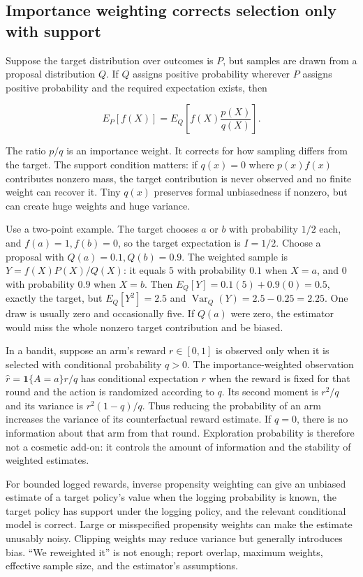 \subsection{Importance weighting corrects selection only with support}\label{02-foundations-ii-ch029-importance-weighting-corrects-selection-only-with-support}

Suppose the target distribution over outcomes is \(P\), but samples are drawn from a proposal distribution \(Q\). If \(Q\) assigns positive probability wherever \(P\) assigns positive probability and the required expectation exists, then

\[
E_P[f(X)]=E_Q\left[f(X)\frac{p(X)}{q(X)}\right].
\]

The ratio \(p/q\) is an importance weight. It corrects for how sampling differs from the target. The support condition matters: if \(q(x)=0\) where \(p(x)f(x)\) contributes nonzero mass, the target contribution is never observed and no finite weight can recover it. Tiny \(q(x)\) preserves formal unbiasedness if nonzero, but can create huge weights and huge variance.

Use a two-point example. The target chooses \(a\) or \(b\) with probability \(1/2\) each, and \(f(a)=1,f(b)=0\), so the target expectation is \(I=1/2\). Choose a proposal with \(Q(a)=0.1,Q(b)=0.9\). The weighted sample is \(Y=f(X)P(X)/Q(X)\): it equals \(5\) with probability \(0.1\) when \(X=a\), and \(0\) with probability \(0.9\) when \(X=b\). Then \(E_Q[Y]=0.1(5)+0.9(0)=0.5\), exactly the target, but \(E_Q[Y^2]=2.5\) and \(\operatorname{Var}_Q(Y)=2.5-0.25=2.25\). One draw is usually zero and occasionally five. If \(Q(a)\) were zero, the estimator would miss the whole nonzero target contribution and be biased.

In a bandit, suppose an arm's reward \(r\in[0,1]\) is observed only when it is selected with conditional probability \(q>0\). The importance-weighted observation \(\hat r=\mathbf 1\{A=a\}r/q\) has conditional expectation \(r\) when the reward is fixed for that round and the action is randomized according to \(q\). Its second moment is \(r^2/q\) and its variance is \(r^2(1-q)/q\). Thus reducing the probability of an arm increases the variance of its counterfactual reward estimate. If \(q=0\), there is no information about that arm from that round. Exploration probability is therefore not a cosmetic add-on: it controls the amount of information and the stability of weighted estimates.

For bounded logged rewards, inverse propensity weighting can give an unbiased estimate of a target policy's value when the logging probability is known, the target policy has support under the logging policy, and the relevant conditional model is correct. Large or misspecified propensity weights can make the estimate unusably noisy. Clipping weights may reduce variance but generally introduces bias. ``We reweighted it'' is not enough; report overlap, maximum weights, effective sample size, and the estimator's assumptions.

